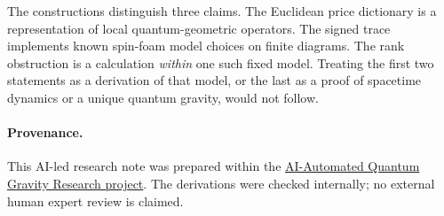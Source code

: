 \documentclass[11pt]{article}
\theoremstyle{remark}
\begin{document}
The constructions distinguish three claims. The Euclidean price dictionary is a representation of local quantum-geometric operators. The signed trace implements known spin-foam model choices on finite diagrams. The rank obstruction is a calculation \emph{within} one such fixed model. Treating the first two statements as a derivation of that model, or the last as a proof of spacetime dynamics or a unique quantum gravity, would not follow.

\paragraph{Provenance.} This AI-led research note was prepared within the \href{https://github.com/g3173028019-beep/ai-automated-quantum-gravity-research}{AI-Automated Quantum Gravity Research project}. The derivations were checked internally; no external human expert review is claimed.
\end{document}
